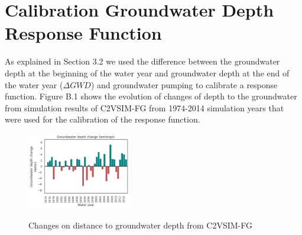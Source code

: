 \documentclass[11pt,a4paper]{article}
\begin{document}
\setcounter{figure}{0} 
\setcounter{equation}{0} 
\setcounter{table}{0} 


\section{Calibration Groundwater Depth Response Function}

As explained in Section 3.2 we used the difference between the groundwater depth at the beginning of the water year and groundwater depth at the end of the water year ($\Delta{GWD}$) and groundwater pumping to calibrate a response function. Figure B.1 shows the evolution of changes of depth to the groundwater from simulation results of C2VSIM-FG from 1974-2014 simulation years that were used for the calibration of the response function. 



\begin{figure}[H]
\centering
    \includegraphics[width=0.4\textwidth]{Depth_change_semitropic}
    \label{fig:mesh1}
    \caption{Changes on distance to groundwater depth from C2VSIM-FG}
\end{figure}
\end{document}
